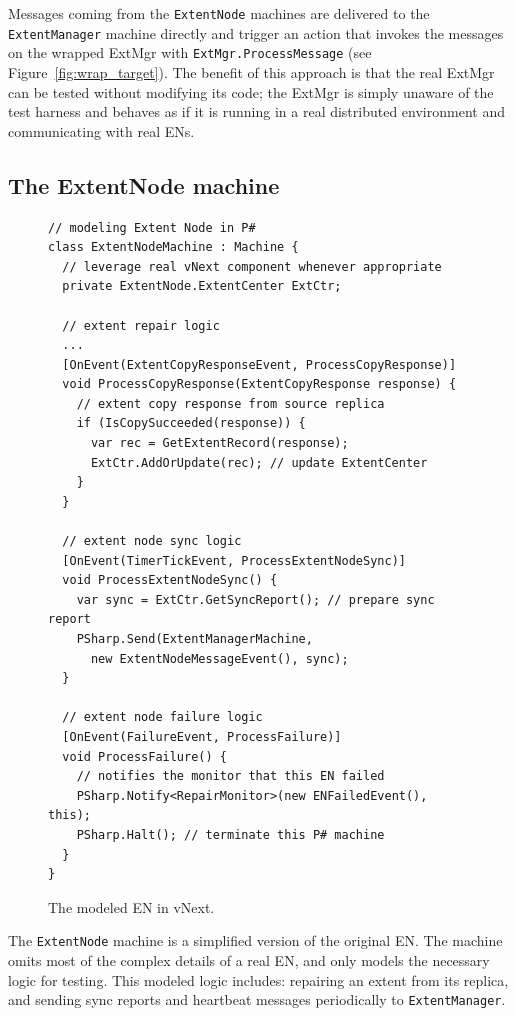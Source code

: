 Messages coming from the \texttt{ExtentNode} machines  are delivered to the \texttt{ExtentManager} machine directly and trigger an action that invokes the messages on the wrapped ExtMgr with \texttt{ExtMgr.ProcessMessage} (see Figure~\ref{fig:wrap_target}). The benefit of this approach is that the real ExtMgr can be tested without modifying its code; the ExtMgr is simply unaware of the \psharp test harness and behaves as if it is running in a real distributed environment and communicating with real ENs.

\subsection{The ExtentNode machine}
\label{sec:method:mock_en}

\begin{figure}[t]
\begin{lstlisting}
// modeling Extent Node in P#
class ExtentNodeMachine : Machine {
  // leverage real vNext component whenever appropriate
  private ExtentNode.ExtentCenter ExtCtr;

  // extent repair logic
  ...
  [OnEvent(ExtentCopyResponseEvent, ProcessCopyResponse)]
  void ProcessCopyResponse(ExtentCopyResponse response) {
    // extent copy response from source replica
    if (IsCopySucceeded(response)) {
      var rec = GetExtentRecord(response);
      ExtCtr.AddOrUpdate(rec); // update ExtentCenter
    }
  }

  // extent node sync logic
  [OnEvent(TimerTickEvent, ProcessExtentNodeSync)]
  void ProcessExtentNodeSync() {
    var sync = ExtCtr.GetSyncReport(); // prepare sync report
    PSharp.Send(ExtentManagerMachine, 
      new ExtentNodeMessageEvent(), sync);
  }
  
  // extent node failure logic
  [OnEvent(FailureEvent, ProcessFailure)]
  void ProcessFailure() {
    // notifies the monitor that this EN failed
    PSharp.Notify<RepairMonitor>(new ENFailedEvent(), this);
    PSharp.Halt(); // terminate this P# machine
  }
}
\end{lstlisting}
\vspace{-4mm}
\caption{The modeled EN in vNext.}
\label{fig:mocked_en}
\vspace{-2mm}
\end{figure}

The \texttt{ExtentNode} machine is a simplified version of the original EN. The machine omits most of the complex details of a real EN, and only models the necessary logic for testing. This modeled logic includes: repairing an extent from its replica, and sending sync reports and heartbeat messages periodically to \texttt{ExtentManager}. 

